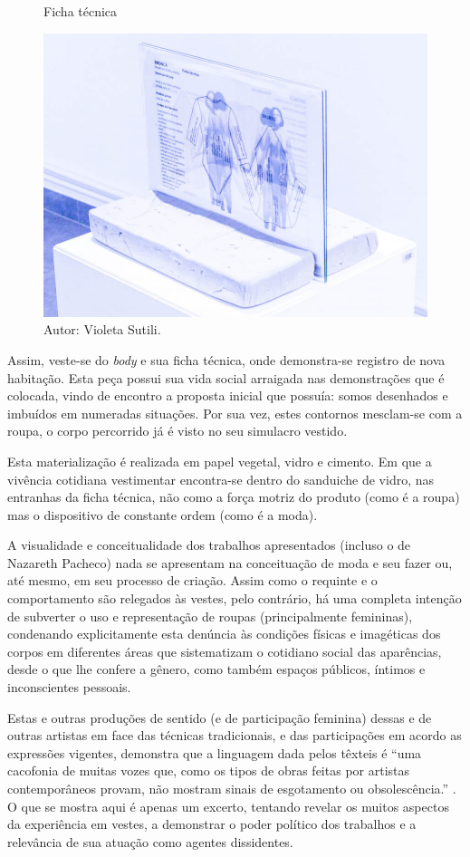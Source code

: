 \begin{refsection}
    \begin{figure}[ht]%
        \centering%
        \caption{Ficha técnica}%
        \includegraphics[width=.75\textwidth]{articles/13-dispositivo-moda-a-r/image3.jpg}%
        \caption*{Autor: Violeta Sutili.}%
        \label{fig:ficha-tecnica}%
    \end{figure}%

    Assim, veste-se do \textit{body} e sua ficha técnica, onde demonstra-se registro de nova habitação. Esta peça possui sua vida social arraigada nas demonstrações que é colocada, vindo de encontro a proposta inicial que possuía: somos desenhados e imbuídos em numeradas situações. Por sua vez, estes contornos mesclam-se com a roupa, o corpo percorrido já é visto no seu simulacro vestido. 

    Esta materialização é realizada em papel vegetal, vidro e cimento. Em que a vivência cotidiana vestimentar encontra-se dentro do sanduiche de vidro, nas entranhas da ficha técnica, não como a força motriz do produto (como é a roupa) mas o dispositivo de constante ordem (como é a moda). 

    A visualidade e conceitualidade dos trabalhos apresentados (incluso o de Nazareth Pacheco) nada se apresentam na conceituação de moda e seu fazer ou, até mesmo, em seu processo de criação. Assim como o requinte e o comportamento são relegados às vestes, pelo contrário, há uma completa intenção de subverter o uso e representação de roupas (principalmente femininas), condenando explicitamente esta denúncia às condições físicas e imagéticas dos corpos em diferentes áreas que sistematizam o cotidiano social das aparências, desde o que lhe confere a gênero, como também espaços públicos, íntimos e inconscientes pessoais.  

    Estas e outras produções de sentido (e de participação feminina) dessas e de outras artistas em face das técnicas tradicionais, e das participações em acordo as expressões vigentes, demonstra que a linguagem dada pelos têxteis é ``uma cacofonia de muitas vozes que, como os tipos de obras feitas por artistas contemporâneos provam, não mostram sinais de esgotamento ou obsolescência.'' \cite{Bell2015New}. O que se mostra aqui é apenas um excerto, tentando revelar os muitos aspectos da experiência em vestes, a demonstrar o poder político dos trabalhos e a relevância de sua atuação como agentes dissidentes.


\end{refsection}
